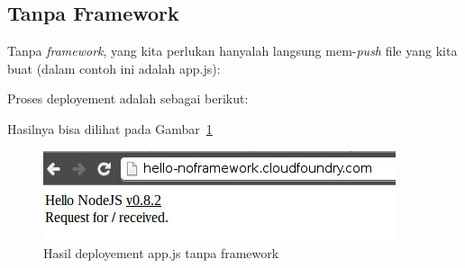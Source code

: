 \subsection{Tanpa Framework}

Tanpa \textit{framework}, yang kita perlukan hanyalah langsung mem-\textit{push} file yang kita buat (dalam contoh ini adalah app.js):

\lstset{language=Javascript,caption=app.js tanpa framework}


Proses deployement adalah sebagai berikut:

\lstset{language=bash,caption=Deployment app.js tanpa framework}


Hasilnya bisa dilihat pada Gambar~\ref{fig:modul1-hello-no-framework}

  \begin{figure}
    \begin{center}
      \includegraphics[scale=0.5]{images/hello-noframework.jpg}
    \end{center}
    \caption{Hasil deployement app.js tanpa framework}
    \label{fig:modul1-hello-no-framework}
  \end{figure}
